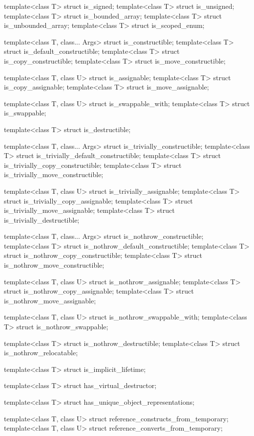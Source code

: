 \begin{codeblock}
{  template<class T> struct is_signed;
  template<class T> struct is_unsigned;
  template<class T> struct is_bounded_array;
  template<class T> struct is_unbounded_array;
  template<class T> struct is_scoped_enum;

  template<class T, class... Args> struct is_constructible;
  template<class T> struct is_default_constructible;
  template<class T> struct is_copy_constructible;
  template<class T> struct is_move_constructible;

  template<class T, class U> struct is_assignable;
  template<class T> struct is_copy_assignable;
  template<class T> struct is_move_assignable;

  template<class T, class U> struct is_swappable_with;
  template<class T> struct is_swappable;

  template<class T> struct is_destructible;

  template<class T, class... Args> struct is_trivially_constructible;
  template<class T> struct is_trivially_default_constructible;
  template<class T> struct is_trivially_copy_constructible;
  template<class T> struct is_trivially_move_constructible;

  template<class T, class U> struct is_trivially_assignable;
  template<class T> struct is_trivially_copy_assignable;
  template<class T> struct is_trivially_move_assignable;
  template<class T> struct is_trivially_destructible;

  template<class T, class... Args> struct is_nothrow_constructible;
  template<class T> struct is_nothrow_default_constructible;
  template<class T> struct is_nothrow_copy_constructible;
  template<class T> struct is_nothrow_move_constructible;

  template<class T, class U> struct is_nothrow_assignable;
  template<class T> struct is_nothrow_copy_assignable;
  template<class T> struct is_nothrow_move_assignable;

  template<class T, class U> struct is_nothrow_swappable_with;
  template<class T> struct is_nothrow_swappable;

  template<class T> struct is_nothrow_destructible;
  template<class T> struct is_nothrow_relocatable;

  template<class T> struct is_implicit_lifetime;

  template<class T> struct has_virtual_destructor;

  template<class T> struct has_unique_object_representations;

  template<class T, class U> struct reference_constructs_from_temporary;
  template<class T, class U> struct reference_converts_from_temporary;

}
\end{codeblock}
